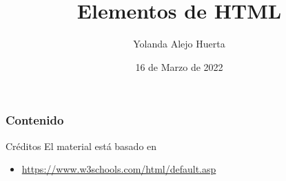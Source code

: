 \documentclass[aspectratio=169]{beamer}
\title{Elementos de HTML} %
\author{Yolanda Alejo Huerta} %
\institute[CBTIS 246] %
{
 Centro de Bachillerato Tecnológico\\%
 Industrial y de Servicios 246 \\
 El Amo Torres \\
\medskip
\textit{yolanda.alejo@cbtis-246.edu.mx}
}
\date{
  16 de Marzo de 2022
} %
\begin{document}
\begin{frame}
    \titlepage
\end{frame}

\begin{frame}
    \frametitle{Contenido}
    \tableofcontents
\end{frame}



\begin{frame}[c]{Créditos}
  El material está basado en
  \begin{itemize}
    \item \href{https://www.w3schools.com/html/default.asp}{https://www.w3schools.com/html/default.asp}
  \end{itemize}
\end{frame}
\end{document}
